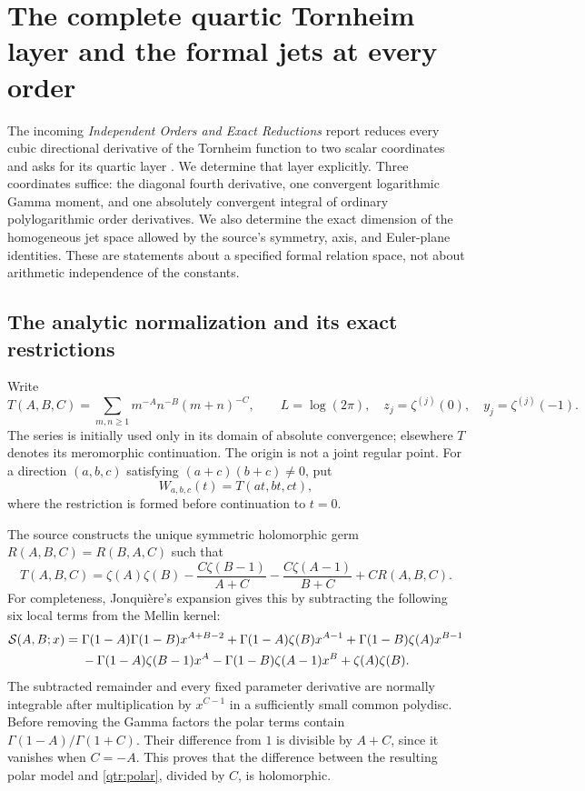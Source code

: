 \section{The complete quartic Tornheim layer and the formal jets at every order}
\label{qtr:section}

The incoming \emph{Independent Orders and Exact Reductions} report
reduces every cubic directional derivative of the Tornheim function to
two scalar coordinates and asks for its quartic layer
\cite{qtr:Independent}. We determine that layer explicitly. Three
coordinates suffice: the diagonal fourth derivative, one convergent
logarithmic Gamma moment, and one absolutely convergent integral of
ordinary polylogarithmic order derivatives. We also determine the exact
dimension of the homogeneous jet space allowed by the source's symmetry,
axis, and Euler-plane identities. These are statements about a
specified formal relation space, not about arithmetic independence of
the constants.

\subsection{The analytic normalization and its exact restrictions}

Write
\[
 T(A,B,C)=\sum_{m,n\ge1}m^{-A}n^{-B}(m+n)^{-C},\qquad
 L=\log(2\pi),\quad z_j=\zeta^{(j)}(0),\quad
 y_j=\zeta^{(j)}(-1).
\]
The series is initially used only in its domain of absolute
convergence; elsewhere \(T\) denotes its meromorphic continuation.
The origin is not a joint regular point. For a direction
\((a,b,c)\) satisfying \((a+c)(b+c)\ne0\), put
\[
 W_{a,b,c}(t)=T(at,bt,ct),
\]
where the restriction is formed before continuation to \(t=0\).

The source constructs the unique symmetric holomorphic germ
\(R(A,B,C)=R(B,A,C)\) such that
\begin{equation}\label{qtr:polar}
 T(A,B,C)=\zeta(A)\zeta(B)
 -\frac{C\zeta(B-1)}{A+C}
 -\frac{C\zeta(A-1)}{B+C}+C R(A,B,C).
\end{equation}
For completeness, Jonqui\`ere's expansion \cite[25.12.12]{DLMF}
gives this by subtracting the following six local terms from the
Mellin kernel:
\begin{align}
 \mathcal S(A,B;x)={}&
 \Gamma(1-A)\Gamma(1-B)x^{A+B-2}
 +\Gamma(1-A)\zeta(B)x^{A-1}
 +\Gamma(1-B)\zeta(A)x^{B-1}\notag\\
 &-\Gamma(1-A)\zeta(B-1)x^A
 -\Gamma(1-B)\zeta(A-1)x^B+\zeta(A)\zeta(B).
 \label{qtr:S}
\end{align}
The subtracted remainder and every fixed parameter derivative are
normally integrable after multiplication by \(x^{C-1}\) in a
sufficiently small common polydisc. Before removing the Gamma
factors the polar terms contain
\(\Gamma(1-A)/\Gamma(1+C)\). Their difference from \(1\) is
divisible by \(A+C\), since it vanishes when \(C=-A\).
This proves that the difference between the resulting polar model
and \eqref{qtr:polar}, divided by \(C\), is holomorphic.

